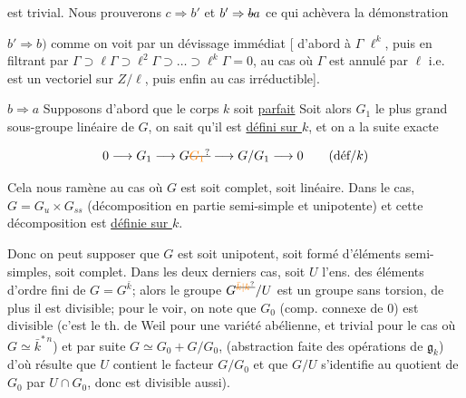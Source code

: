 est trivial. Nous prouverons $c\Rightarrow b'$ et $b'\Rightarrow\deleted{b} a$ ce qui achèvera la démonstration

$b'\Rightarrow b)$  comme on voit par un dévissage immédiat [  d'abord à $\Gamma$    $\ell^k$, puis en filtrant par $\Gamma\supset\ell\Gamma\supset\ell^2\Gamma\supset\ldots\supset\ell^k\Gamma=0$, au cas où $\Gamma$ est annulé par $\ell$ i.e. est un vectoriel sur $Z/\ell$, puis enfin au cas irréductible].

$b\Rightarrow a$  Supposons d'abord que le corps  $k$ soit \uline{parfait} Soit alors $G_1$ le plus grand sous-groupe linéaire de $G$, on sait qu'il est \uline{défini sur $k$}, et on a la suite exacte

\[0\longrightarrow G_1\longrightarrow G\deleted{\unsure{G_1}}\longrightarrow G/G_1\longrightarrow0\qquad(\text{déf}/k)\]



Cela nous ramène au cas où $G$ est soit complet, soit linéaire. Dans le   cas,  $G=G_u\times G_{ss}$ (décomposition en partie semi-simple et unipotente) et cette décomposition est \uline{définie sur $k$}.


Donc on peut supposer que $G$ est soit unipotent, soit  formé d'éléments semi-simples, soit complet. Dans les deux derniers cas, soit $U$ l'ens. des éléments d'ordre fini de $G=G^{\bar k}$; alors le groupe $G^{\deleted{\unsure{\bar k|k}}}/U$ est un groupe sans torsion, de plus il est divisible; pour le voir, on note que $G_0$ (comp. connexe de $0$) est divisible (c'est le th. de Weil pour une variété abélienne, et  trivial pour le cas où $G\simeq\bar k^{*\,n}$) et  par suite $G\simeq G_0+G/G_0$,  (abstraction faite des opérations de $\mathfrak g_k$) d'où résulte que $U$ contient le facteur $G/G_0$ et que $G/U$ s'identifie au  quotient de $G_0$ par $U\cap G_0$, donc est divisible aussi).

